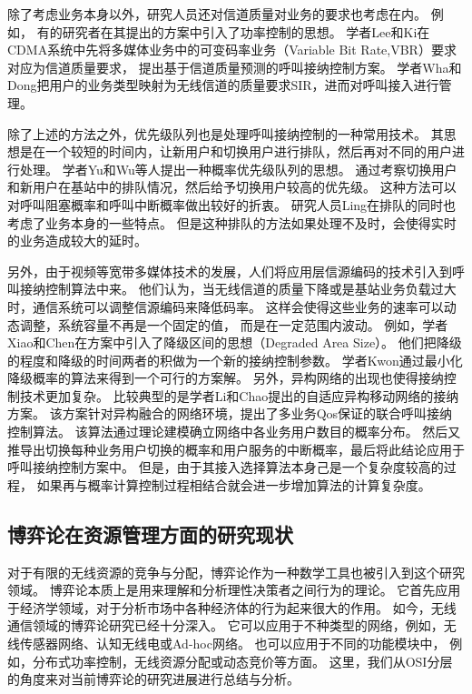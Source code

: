 除了考虑业务本身以外，研究人员还对信道质量对业务的要求也考虑在内。 例如，
有的研究者在其提出的方案中引入了功率控制的思想\cite{LiuZhang:2002}\cite{ZhangFang:2006}。
学者Lee和Ki在CDMA系统中先将多媒体业务中的可变码率业务（Variable Bit Rate,VBR）要求对应为信道质量要求，
提出基于信道质量预测的呼叫接纳控制方案\cite{Lee:2004}。
学者Wha和Dong把用户的业务类型映射为无线信道的质量要求SIR，进而对呼叫接入进行管理\cite{JeonJeong:2001}\cite{Wha:2002}。

除了上述的方法之外，优先级队列也是处理呼叫接纳控制的一种常用技术。
其思想是在一个较短的时间内，让新用户和切换用户进行排队，然后再对不同的用户进行处理。
学者Yu和Wu等人提出一种概率优先级队列的思想。
通过考察切换用户和新用户在基站中的排队情况，然后给予切换用户较高的优先级。
这种方法可以对呼叫阻塞概率和呼叫中断概率做出较好的折衷\cite{Yu:2006}。
研究人员Ling在排队的同时也考虑了业务本身的一些特点\cite{Ling:2009}。
但是这种排队的方法如果处理不及时，会使得实时的业务造成较大的延时。


另外，由于视频等宽带多媒体技术的发展，人们将应用层信源编码的技术引入到呼叫接纳控制算法中来。
他们认为，当无线信道的质量下降或是基站业务负载过大时，通信系统可以调整信源编码来降低码率。
这样会使得这些业务的速率可以动态调整，系统容量不再是一个固定的值，
而是在一定范围内波动。
例如，学者Xiao和Chen在方案中引入了降级区间的思想（Degraded Area Size）\cite{XiaoChen:2000}。
他们把降级的程度和降级的时间两者的积做为一个新的接纳控制参数。
学者Kwon通过最小化降级概率的算法来得到一个可行的方案解\cite{KwonChoi:1999}。
另外，异构网络的出现也使得接纳控制技术更加复杂。
比较典型的是学者Li和Chao提出的自适应异构移动网络的接纳方案\cite{LiChao:2007}。
该方案针对异构融合的网络环境，提出了多业务Qos保证的联合呼叫接纳控制算法。
该算法通过理论建模确立网络中各业务用户数目的概率分布。
然后又推导出切换每种业务用户切换的概率和用户服务的中断概率，最后将此结论应用于呼叫接纳控制方案中。 
但是，由于其接入选择算法本身己是一个复杂度较高的过程，
如果再与概率计算控制过程相结合就会进一步增加算法的计算复杂度。



\subsection{博弈论在资源管理方面的研究现状}
对于有限的无线资源的竞争与分配，博弈论作为一种数学工具也被引入到这个研究领域。
博弈论本质上是用来理解和分析理性决策者之间行为的理论。
它首先应用于经济学领域，对于分析市场中各种经济体的行为起来很大的作用。
如今，无线通信领域的博弈论研究已经十分深入。
它可以应用于不种类型的网络，例如，无线传感器网络、认知无线电或Ad-hoc网络\cite{MachadoTekinay:2008}\cite{WangWu:2010}\cite{Srivastava:2005}。
也可以应用于不同的功能模块中，
例如，分布式功率控制，无线资源分配或动态竞价等方面\cite{AlpcanBasar:2006}\cite{Senqupta:2009}。
这里，我们从OSI分层的角度来对当前博弈论的研究进展进行总结与分析。

